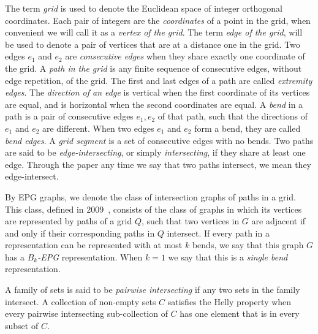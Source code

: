 \documentclass[preprint,12pt]{elsarticle} %
\begin{document}
The term \emph{grid} is used to denote the Euclidean space of integer orthogonal coordinates. Each pair of integers are the \emph{coordinates} of a point in the grid, when convenient we will call it as a \emph {vertex of the grid}. The term \emph{edge of the grid}, will be used to denote a pair of vertices that are at a distance one in the grid. Two edges $e_1$ and $e_2$ are \emph{consecutive edges} when they share exactly one coordinate of the grid. %
 A \emph{path in the grid} is any finite sequence of consecutive edges, without edge repetition, of the grid. The first and last edges of a path are called \emph{extremity edges}.
The \emph{direction of an edge} is vertical when the first coordinate of its vertices  are equal, and is horizontal when the second coordinates are equal. A \emph {bend} in a path is a pair of consecutive edges $ e_1, e_2 $ of that path, such that the directions of $ e_1$ and $ e_2$ are different. When two edges $ e_1$ and $e_2 $ form a bend, they are called \emph { bend edges}. A \emph {grid segment} is a set of consecutive edges with no bends. %
 Two paths are said to be \emph{edge-intersecting}, or  simply  \emph{intersecting}, if they share at least one edge. %
 Through the paper any time we say that two paths intersect, we mean they edge-intersect.  %

By EPG graphs, we denote the class of intersection graphs of paths in a grid. This class, defined in 2009~\citep{golumbic2009}, consists of the class of graphs in which its vertices are represented by paths of a grid $ Q $, such that two vertices in $ G $ are adjacent if and only if their corresponding paths in $ Q $ intersect. If every path in a representation can be represented with at most $ k $ bends, we say that this graph $ G $ has a \emph{ $ B_k$-EPG} representation.%
When $ k = 1 $ we say that this is a \emph{single bend} representation.


A family of sets is said to be \emph{pairwise intersecting} if any two sets in the family intersect. A collection of non-empty sets $C$ satisfies the Helly property when every pairwise intersecting sub-collection of $ C $ has one element that is in every subset of $C$.
\end{document}
